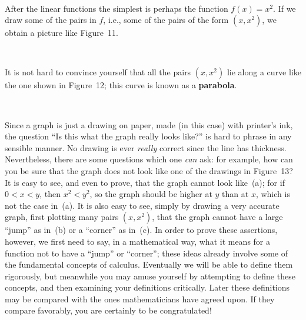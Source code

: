 \begin{center}
\\[0.6em]
\end{center}

After the linear functions the simplest is perhaps the function $f(x)=x^2$. If
we draw some of the pairs in $f$, i.e., some of the pairs of the form
$(x,x^2)$, we obtain a picture like Figure~11.

\begin{center}
\\[0.6em]
\end{center}

It is not hard to convince yourself that all the pairs $(x,x^2)$ lie along a
curve like the one shown in Figure~12; this curve is known as a
\textbf{parabola}.

\begin{center}
\\[0.6em]
\end{center}

Since a graph is just a drawing on paper, made (in this case) with printer's
ink, the question ``Is this what the graph really looks like?'' is hard to
phrase in any sensible manner. No drawing is ever \emph{really} correct since
the line has thickness. Nevertheless, there are some questions which one
\emph{can} ask: for example, how can you be sure that the graph does not look
like one of the drawings in Figure~13? It is easy to see, and even to prove,
that the graph cannot look like~(a); for if $0<x<y$, then $x^2<y^2$, so the
graph should be higher at $y$ than at $x$, which is not the case in~(a). It is
also easy to see, simply by drawing a very accurate graph, first plotting many
pairs $(x,x^2)$, that the graph cannot have a large ``jump'' as in~(b) or a
``corner'' as in~(c). In order to prove these assertions, however, we first
need to say, in a mathematical way, what it means for a function not to have a
``jump'' or ``corner''; these ideas already involve some of the fundamental
concepts of calculus. Eventually we will be able to define them rigorously,
but meanwhile you may amuse yourself by attempting to define these concepts,
and then examining your definitions critically. Later these definitions may be
compared with the ones mathematicians have agreed upon. If they compare
favorably, you are certainly to be congratulated!

\begin{center}
\\[0.6em]
\end{center}

